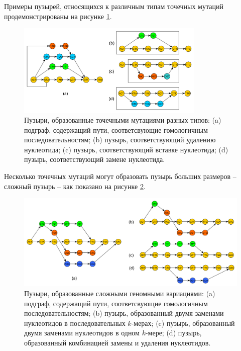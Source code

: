 Примеры пузырей, относящихся к различным типам точечных мутаций продемонстрированы на рисунке \ref{fig:pm_ex}.
\begin{figure}[!th]
	\centering
	\includegraphics[width=0.8\textwidth]{img/pm_ex.pdf}
	\caption{Пузыри, образованные точечными мутациями разных типов: (a) подграф, содержащий пути, соответсвующие гомологичным последовательностям; (b) пузырь, соответствующий удалению нуклеотида; (c) пузырь, соответствующий вставке нуклеотида; (d) пузырь, соответствующий замене нуклеотида.}
	\label{fig:pm_ex}
\end{figure}

Несколько точечных мутаций могут образовать пузырь больших размеров -- сложный пузырь -- как показано на рисунке \ref{fig:cv_ex}. 
\begin{figure}[h!t]
	\centering
	\includegraphics[width=\textwidth]{img/cv_ex.pdf}
	\caption{Пузыри, образованные сложными геномными вариациями: (a) подграф, содержащий пути, соответсвующие гомологичным последовательностям; (b) пузырь, образованный двумя заменами нуклеотидов в последовательных $k$-мерах; (c) пузырь, образованный двумя заменами нуклеотидов в одном $k$-мере; (d) пузырь, образованный комбинацией замены и удаления нуклеотидов.}
	\label{fig:cv_ex}
\end{figure}

